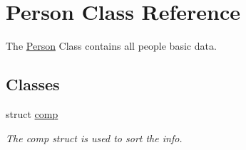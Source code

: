 \hypertarget{class_person}{\section{Person Class Reference}
\label{class_person}
}


The \hyperlink{class_person}{Person} Class contains all people basic data.  


\subsection*{Classes}
\begin{DoxyCompactItemize}
\item 
struct \hyperlink{struct_person_1_1comp}{comp}
\begin{DoxyCompactList}\small\item\em The comp struct is used to sort the info. \end{DoxyCompactList}\end{DoxyCompactItemize}
